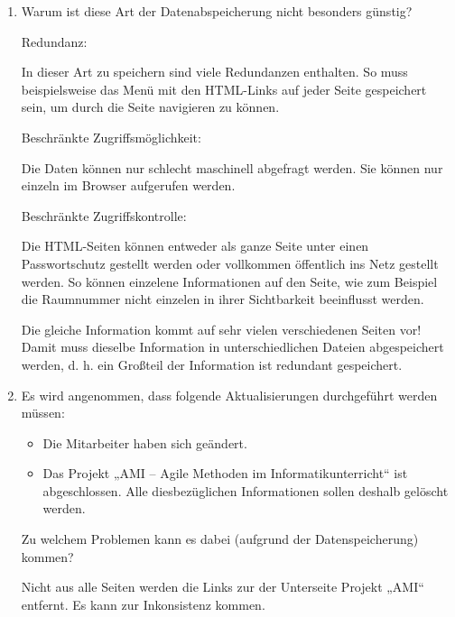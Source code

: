 \documentclass{lehramt-informatik-haupt}
\begin{document}
\begin{enumerate}


\item Warum ist diese Art der Datenabspeicherung nicht besonders
günstig?

\begin{antwort}
Redundanz:

In dieser Art zu speichern sind viele Redundanzen enthalten. So muss
beispielsweise das Menü mit den HTML-Links auf jeder Seite gespeichert
sein, um durch die Seite navigieren zu können.

Beschränkte Zugriffsmöglichkeit:

Die Daten können nur
schlecht maschinell abgefragt werden. Sie können nur einzeln im Browser
aufgerufen werden.

Beschränkte Zugriffskontrolle:

Die HTML-Seiten können entweder als ganze Seite unter einen
Passwortschutz gestellt werden oder vollkommen öffentlich ins Netz
gestellt werden. So können einzelene Informationen auf den Seite, wie
zum Beispiel die Raumnummer nicht einzelen in ihrer Sichtbarkeit
beeinflusst werden.
\end{antwort}

\begin{antwort}[muster]
Die gleiche Information kommt auf sehr vielen verschiedenen Seiten vor!
Damit muss dieselbe Information in unterschiedlichen Dateien
abgespeichert werden, d. h. ein Großteil der Information ist redundant
gespeichert.
\end{antwort}


\item Es wird angenommen, dass folgende Aktualisierungen durchgeführt
werden müssen:

\begin{itemize}
\item Die Mitarbeiter haben sich geändert.
\item Das Projekt „AMI – Agile Methoden im Informatikunterricht“ ist
abgeschlossen. Alle diesbezüglichen Informationen sollen deshalb
gelöscht werden.
\end{itemize}

Zu welchem Problemen kann es dabei (aufgrund der Datenspeicherung)
kommen?

\begin{antwort}
Nicht aus alle Seiten werden die Links zur der Unterseite Projekt „AMI“
entfernt. Es kann zur Inkonsistenz kommen.
\end{antwort}


\end{enumerate}
\end{document}

